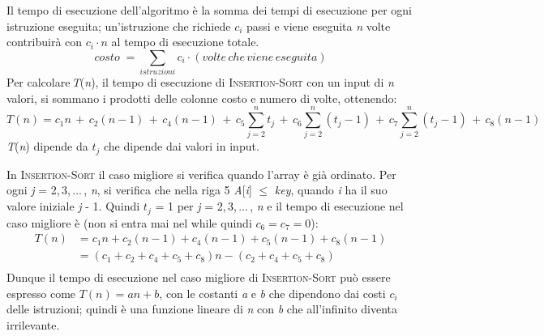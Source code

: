\documentclass[10pt, a4paper]{report}
\begin{document}
Il tempo di esecuzione dell'algoritmo è la somma dei tempi di esecuzione per ogni istruzione eseguita; un'istruzione che richiede $c_i$ passi e viene eseguita \textit{n} volte contribuirà con $c_i\cdot n$ al tempo di esecuzione totale.
\begin{equation*}
costo\;= \sum_{istruzioni} c_i \cdot (volte\,che\,viene\,eseguita)
\end{equation*}
Per calcolare\,\textit{T}(\textit{n}), il tempo di esecuzione di \textsc{Insertion-Sort} con un input di \textit{n} valori, si sommano i prodotti delle colonne costo e numero di volte, ottenendo:
\begin{equation*}
T(n) = c_1n \,+\, c_2(n-1) \,+\, c_4(n-1) \,+\, c_5 \sum_{j=2}^{n} t_j \,+\, c_6\sum_{j=2}^{n} (t_j - 1) \,+\, c_7\sum_{j=2}^{n} (t_j - 1) \,+\, c_8(n-1)
\end{equation*}
\textit{T}(\textit{n}) dipende da $t_j$ che dipende dai valori in input.

In \textsc{Insertion-Sort} il caso migliore si verifica quando l'array è già ordinato. Per ogni \textit{j} = 2,\,3,\,...\,, \textit{n}, si verifica che nella riga 5 \textit{A}[\textit{i}] $\leq$ \textit{key}, quando \textit{i} ha il suo valore iniziale \textit{j} - 1. Quindi $t_j$ = 1 per \textit{j} = 2,\,3,\,...\,, \textit{n} e il tempo di esecuzione nel caso migliore è (non si entra mai nel while quindi $c_6 = c_7 = 0$):
\begin{equation*}
\begin{aligned}
T(n) &= c_1n + c_2(n-1) + c_4(n-1) + c_5(n-1) + c_8(n-1) \\
&= (c_1 + c_2 + c_4 + c_5 + c_8)n - (c_2 + c_4 + c_5 + c_8) \\
\end{aligned}
\end{equation*}
Dunque il tempo di esecuzione nel caso migliore di \textsc{Insertion-Sort} può essere espresso come $T(n) = an + b$, con le costanti \textit{a} e \textit{b} che dipendono dai costi  $c_i$ delle istruzioni; quindi è una funzione lineare di \textit{n} con \textit{b} che all'infinito diventa irrilevante.
\end{document}
